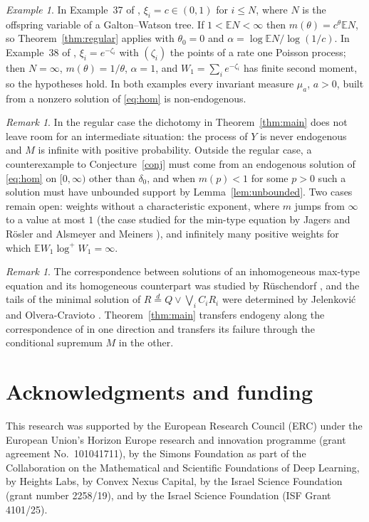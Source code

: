 \documentclass[11pt]{amsart}
\theoremstyle{remark}
\newtheorem{remark}[theorem]{Remark}
\newtheorem{example}[theorem]{Example}
\newcommand{\E}{\mathbb{E}}
\begin{document}
\begin{example}
In Example~37 of \cite{AB}, $\xi_i=c\in(0,1)$ for $i\le N$, where $N$ is the offspring
variable of a Galton--Watson tree. If $1<\E N<\infty$ then $m(\theta)=c^\theta\E N$, so
Theorem~\ref{thm:regular} applies with $\theta_0=0$ and $\alpha=\log\E N/\log(1/c)$. In
Example~38 of \cite{AB}, $\xi_i=e^{-\zeta_i}$ with $(\zeta_i)$ the points of a rate one
Poisson process; then $N=\infty$, $m(\theta)=1/\theta$, $\alpha=1$, and $W_1=\sum_ie^{-\zeta_i}$
has finite second moment, so the hypotheses hold. In both examples every invariant measure
$\mu_a$, $a>0$, built from a nonzero solution of \eqref{eq:hom} is non-endogenous.
\end{example}

\begin{remark}
In the regular case the dichotomy in Theorem~\ref{thm:main} does not leave room for an
intermediate situation: the process of $Y$ is never endogenous and $M$ is infinite with
positive probability. Outside the regular case, a counterexample to Conjecture~\ref{conj}
must come from an endogenous solution of \eqref{eq:hom} on $[0,\infty)$ other than
$\delta_0$, and when $m(p)<1$ for some $p>0$ such a solution must have unbounded support by
Lemma~\ref{lem:unbounded}. Two cases remain open: weights without a characteristic
exponent, where $m$ jumps from $\infty$ to a value at most $1$ (the case studied for the
min-type equation by Jagers and R\"osler \cite{JR} and Alsmeyer and Meiners \cite{AM}), and
infinitely many positive weights for which $\E W_1\log^+W_1=\infty$.
\end{remark}

\begin{remark}
The correspondence between solutions of an inhomogeneous max-type equation and its
homogeneous counterpart was studied by R\"uschendorf \cite{R}, and the tails of the minimal solution of
$R\stackrel{d}{=}Q\vee\bigvee_i C_iR_i$ were determined by Jelenkovi\'c and Olvera-Cravioto
\cite{JOC}. Theorem~\ref{thm:main}
transfers endogeny along the correspondence of \cite[Corollary~33]{AB} in one direction
and transfers its failure through the conditional supremum $M$ in the other.
\end{remark}

\section*{Acknowledgments and funding}

This research was supported by the European Research Council (ERC) under the European Union's Horizon Europe research and innovation programme (grant agreement No.~101041711), by the Simons Foundation as part of the Collaboration on the Mathematical and Scientific Foundations of Deep Learning, by Heights Labs, by Convex Nexus Capital, by the Israel Science Foundation (grant number 2258/19), and by the Israel Science Foundation (ISF Grant 4101/25).
\end{document}
